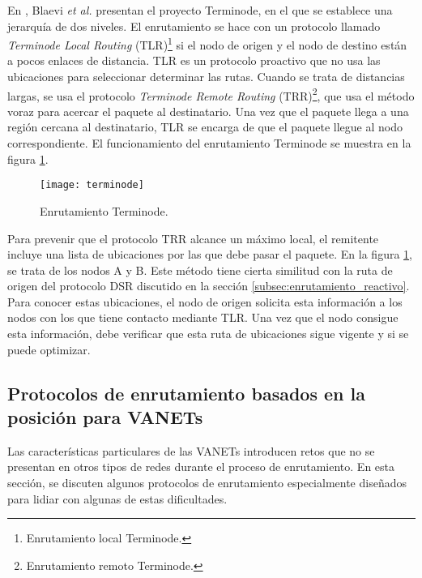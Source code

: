 En \cite{Blaevi2002}, Blaevi \textit{et al.} presentan el proyecto Terminode,
en el que se establece una jerarquía de dos niveles. El enrutamiento se hace
con un protocolo llamado \textit{Terminode Local Routing}
(TLR)\footnote{Enrutamiento local Terminode.} si el nodo de origen y el nodo de
destino están a pocos enlaces de distancia. TLR es un protocolo proactivo que
no usa las ubicaciones para seleccionar determinar las rutas. Cuando se trata
de distancias largas, se usa el protocolo \textit{Terminode Remote Routing}
(TRR)\footnote{Enrutamiento remoto Terminode.}, que usa el método voraz para
acercar el paquete al destinatario. Una vez que el paquete llega a una región
cercana al destinatario, TLR se encarga de que el paquete llegue al nodo
correspondiente. El funcionamiento del enrutamiento Terminode se muestra en la
figura \ref{fig:terminode}.

\begin{figure}[th]
\centering
\texttt{[image: terminode]}
\decoRule
\caption[Enrutamiento Terminode]{Enrutamiento Terminode.}
\label{fig:terminode}
\end{figure}

Para prevenir que el protocolo TRR alcance un máximo local, el remitente incluye
una lista de ubicaciones por las que debe pasar el paquete. En la figura
\ref{fig:terminode}, se trata de los nodos A y B. Este método tiene cierta
similitud con la ruta de origen del protocolo DSR discutido en la sección
\ref{subsec:enrutamiento_reactivo}. Para conocer estas ubicaciones, el nodo
de origen solicita esta información a los nodos con los que tiene contacto
mediante TLR. Una vez que el nodo consigue esta información, debe verificar que
esta ruta de ubicaciones sigue vigente y si se puede optimizar.

\subsection{Protocolos de enrutamiento basados en la posición para VANETs}

\label{subsec:protocolos_de_enrutamiento_basados_en_la_posicion_para_vanets}

Las características particulares de las VANETs introducen retos que no se
presentan en otros tipos de redes durante el proceso de enrutamiento. En esta
sección, se discuten algunos protocolos de enrutamiento especialmente diseñados
para lidiar con algunas de estas dificultades.

